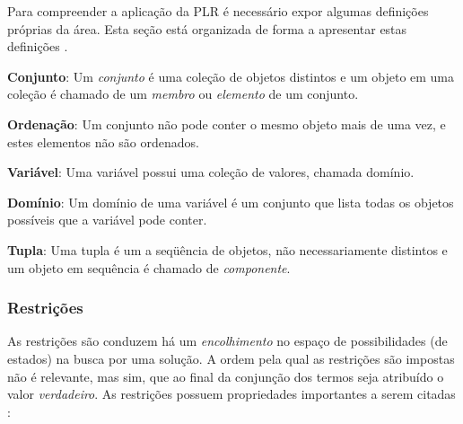 Para compreender a aplicação da PLR é necessário expor algumas definições próprias da área. Esta seção está organizada de forma a apresentar estas definições  \cite{rina2003}.


\textbf{Conjunto}: Um \textit{conjunto} é uma coleção de objetos distintos e um objeto em uma coleção é chamado de um \textit{membro} ou \textit{elemento} de um conjunto.

\textbf{Ordenação}: Um conjunto não pode conter o mesmo objeto mais de uma vez, e estes elementos não são ordenados.

\textbf{Variável}: Uma variável possui uma coleção de valores, chamada domínio.

\textbf{Domínio}: Um domínio de uma variável é um conjunto que lista todas os objetos possíveis que a variável pode conter.

\textbf{Tupla}: Uma tupla é um a seqüência de objetos, não necessariamente distintos e um objeto em sequência é chamado de \textit{componente}.




\subsubsection{Restrições}
\label{sec:restr}

As restrições são conduzem há um \textit{encolhimento}  no espaço de possibilidades (de estados) na busca por uma solução. A ordem pela qual as restrições são impostas não é relevante, mas sim, que ao final da conjunção dos termos seja atribuído o valor \textit{verdadeiro}. As restrições possuem propriedades importantes a serem citadas \cite{sucupira_03}:

